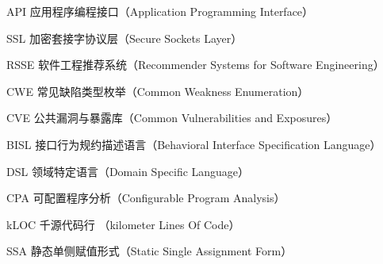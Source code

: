 \begin{denotation}[3cm]
\item[API] 应用程序编程接口（Application Programming Interface）
\item[SSL] 加密套接字协议层（Secure Sockets Layer）
\item[RSSE] 软件工程推荐系统（Recommender Systems for Software Engineering）
\item[CWE] 常见缺陷类型枚举（Common Weakness Enumeration）
\item[CVE] 公共漏洞与暴露库（Common Vulnerabilities and Exposures）
\item[BISL] 接口行为规约描述语言（Behavioral Interface Specification Language）
\item[DSL] 领域特定语言（Domain Specific Language）
\item[CPA] 可配置程序分析（Configurable Program Analysis）
\item[kLOC] 千源代码行 （kilometer Lines Of Code）
\item[SSA] 静态单侧赋值形式（Static Single Assignment Form）
\end{denotation}

